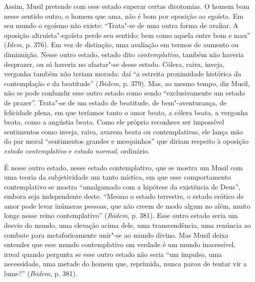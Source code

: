 Assim, Musil pretende com esse estado superar certas dicotomias. O homem
bom nesse sentido outro, o homem que ama, não é bom por oposição ao
egoísta. Em seu mundo o egoísmo não existe: ``Trata"-se de uma outra
forma de avaliar. A oposição altruísta"-egoísta perde seu sentido; bem
como aquela entre bom e mau'' (\emph{Idem}, p. 376). Em vez de
distinção, uma avaliação em termos de aumento ou diminuição. Nesse outro
estado, estado dito \emph{contemplativo}, também não haveria desprazer,
ou só haveria no afastar"-se desse estado. Cólera, raiva, inveja,
vergonha também não teriam morada: daí ``a estreita proximidade
histórica da contemplação e da beatitude'' (\emph{Ibidem}, p. 379). Mas,
ao mesmo tempo, diz Musil, não se pode confundir esse outro estado como
sendo ``exclusivamente um estado de prazer''. Trata"-se de um estado de
beatitude, de bem"-aventurança, de felicidade plena, em que teríamos
tanto o amor beato, a cólera beata, a vergonha beata, como a angústia
beata. Como ele próprio reconhece ser impossível sentimentos como
inveja, raiva, avareza beata ou contemplativas, ele lança mão do par
moral ``sentimentos grandes e mesquinhos'' que diriam respeito à
oposição \emph{estado contemplativo} e \emph{estado normal}, ordinário.

É nesse outro estado, nesse estado contemplativo, que se mostra um Musil
com uma teoria da subjetividade um tanto mística, em que esse
comportamento contemplativo se mostra ``amalgamado com a hipótese da
existência de Deus'', embora seja independente deste. ``Mesmo o estado
terrestre, o estado erótico de amor pode levar inúmeras pessoas, que não
creem de modo algum no além, muito longe nesse reino contemplativo''
(\emph{Ibidem}, p. 381). Esse outro estado seria um desvio do mundo, uma
elevação acima dele, uma transcendência, uma renúncia ao combate para
metaforicamente unir"-se ao mundo divino. Mas Musil deixa entender que
esse mundo contemplativo em verdade é um mundo inacessível, irreal
quando pergunta se esse outro estado não seria ``um impulso, uma
necessidade, uma metade do homem que, reprimida, nunca parou de tentar
vir a lume?'' (\emph{Ibidem}, p. 381).

